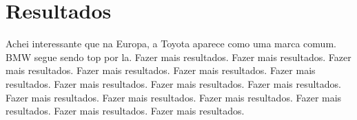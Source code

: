 \documentclass[10pt, conference]{IEEEtran}
\begin{document}



\section{Resultados}
%
Achei interessante que na Europa, a Toyota aparece como uma marca comum. BMW segue sendo top por la.
Fazer mais resultados. Fazer mais resultados. Fazer mais resultados. Fazer mais resultados. Fazer mais resultados. 
Fazer mais resultados. Fazer mais resultados. Fazer mais resultados. Fazer mais resultados. Fazer mais resultados. 
Fazer mais resultados. Fazer mais resultados. Fazer mais resultados. Fazer mais resultados. Fazer mais resultados. 




%


%


%


%



%
\end{document}
